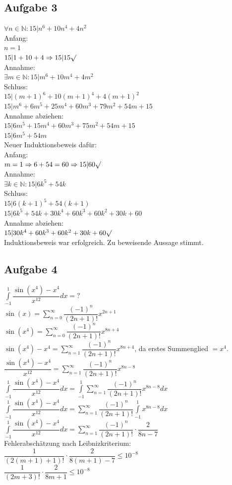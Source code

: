 \documentclass[11pt,final]{scrreprt}
\newcommand{\N} {\mathbb N}
\begin{document}
\subsection*{Aufgabe 3}
$ \forall n\in\N\colon 15|n^6+10n^4+4n^2 $\\
Anfang:\\
$n=1$\\
$15| 1+10+4 \Rightarrow 15|15 \surd$\\
Annahme:\\
$\exists m \in\N\colon 15|m^6+10m^4+4m^2$\\
Schluss:\\
$ 15 | (m+1)^6+10(m+1)^4+4(m+1)^2$\\
$ 15| m^6+6m^5+25m^4+60m^3+79m^2+54m+15$\\
Annahme abziehen:\\
$ 15| 6m^5+15m^4+60m^3+75m^2+54m+15 $\\
$ 15| 6m^5+54m$\\
Neuer Induktionsbeweis dafür:\\
Anfang:\\
$m=1\Rightarrow 6+54=60 \Rightarrow 15|60 \surd$\\
Annahme:\\
$ \exists k \in\N\colon 15|6k^5+54k$\\
Schluss:\\
$ 15|6(k+1)^5 + 54(k+1)$\\
$ 15| 6k^5+54k+30k^4+60k^3+60k^2+30k+60$\\
Annahme abziehen:\\
$ 15|30k^4+60k^3+60k^2+30k+60 \surd $\\
Induktionsbeweis war erfolgreich. Zu beweisende Aussage stimmt.
\subsection*{Aufgabe 4}
$ \int\limits_{-1}^1\dfrac{\sin(x^4)-x^4}{x^{12}} dx = ? $\\
$ \sin(x) = \sum\limits_{n=0}^{\infty}\dfrac{(-1)^n}{(2n+1)!}x^{2n+1} $\\
$ \sin(x^4) = \sum\limits_{n=0}^{\infty}\dfrac{(-1)^n}{(2n+1)!}x^{8n+4} $\\
$ \sin(x^4)-x^4 = \sum\limits_{n=1}^{\infty}\dfrac{(-1)^n}{(2n+1)!}x^{8n+4} $, da erstes Summenglied $ = x^4$.\\
$ \dfrac{\sin(x^4)-x^4}{x^{12}} = \sum\limits_{n=1}^{\infty}\dfrac{(-1)^n}{(2n+1)!}x^{8n-8} $\\
$ \int\limits_{-1}^1\dfrac{\sin(x^4)-x^4}{x^{12}}dx = \int\limits_{-1}^1\sum\limits_{n=1}^{\infty}\dfrac{(-1)^n}{(2n+1)!}x^{8n-8}dx $\\
$ \int\limits_{-1}^1\dfrac{\sin(x^4)-x^4}{x^{12}}dx = \sum\limits_{n=1}^{\infty}\dfrac{(-1)^n}{(2n+1)!}\int\limits_{-1}^1 x^{8n-8}dx $\\
$ \int\limits_{-1}^1\dfrac{\sin(x^4)-x^4}{x^{12}}dx = \sum\limits_{n=1}^{\infty}\dfrac{(-1)^n}{(2n+1)!} \cdot \dfrac{2}{8n-7} $\\
Fehlerabschätzung nach Leibnizkriterium:\\
$\dfrac{1}{(2(m+1)+1)!} \cdot \dfrac{2}{8(m+1)-7} \leq 10^{-8}$\\
$\dfrac{1}{(2m+3)!} \cdot \dfrac{2}{8m+1} \leq 10^{-8}$
\end{document}
